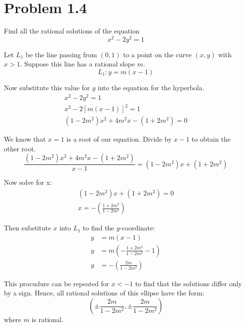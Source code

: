 \section*{Problem 1.4}
Find all the rational solutions of the equation
\[ x^2 - 2y^2 = 1 \]

Let $L_1$ be the line passing from $(0,1)$ to a point on the curve $(x,y)$ with
$x > 1$. Suppose this line has a rational slope $m$.
\[ L_1: y = m(x-1) \]

Now substitute this value for $y$ into the equation for the hyperbola.
\begin{align*}
  x^2 - 2y^2 = 1 \\
  x^2 - 2[m(x-1)]^2 = 1 \\
  (1-2m^2)x^2 + 4m^2x -(1+2m^2) = 0
\end{align*} 

We know that $x=1$ is a root of our equation. Divide by $x-1$ to obtain the
other root.
\[
\frac{(1-2m^2)x^2 + 4m^2x -(1+2m^2)}{x-1} = (1-2m^2)x + (1+2m^2)
\]

Now solve for x:
\begin{align*}
  (1-2m^2)x + (1+2m^2) = 0 \\
                     x = - \left( \frac{1+2m^2}{1-2m^2} \right)
\end{align*}

Then substitute $x$ into $L_1$ to find the $y$-coordinate:
\begin{align*}
  y &= m(x-1) \\
  y &= m\left( -\frac{1+2m^2}{1-2m^2} - 1 \right) \\
  y &= -\left( \frac{2m}{1-2m^2}\right)
\end{align*}

This procudure can be repeated for $x < -1$ to find that the solutions differ
only by a sign. Hence, all rational solutions of this ellipse have the form:
\[
\left( \pm \frac{2m}{1-2m^2}, \pm \frac{2m}{1-2m^2}\right)
\]
where $m$ is rational.
